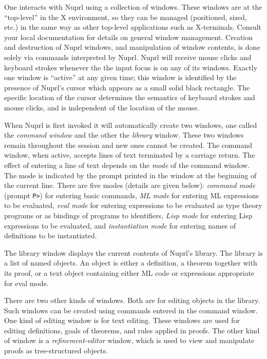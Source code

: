 One interacts with Nuprl using a collection of windows.  These windows are
at the ``top-level'' in the X environment, so they can be managed
(positioned, sized, etc.) in the same way as other top-level applications
such as X-terminals.  Consult your local documentation for details on
general window management.  Creation and destruction of Nuprl windows, and
manipulation of window contents, is done solely via commands interpreted by
Nuprl.  Nuprl will receive mouse clicks and keyboard strokes whenever the
the input focus is on any of its windows.  Exactly one window is
``active'' at any given time; this window is identified by the presence of
Nuprl's cursor which appears as a small solid black rectangle.  The
specific location of the cursor determines the semantics of keyboard
strokes and mouse clicks, and is independent of the location of the mouse.

When Nuprl is first invoked it will automatically create two windows, one
called the {\em command window} and the other the {\em library} window.  These
two windows remain throughout the session and new ones cannot be created.
The command window, when active, accepts lines of text terminated by a
carriage return.  The effect of entering a line of text depends on the
{\em mode} of the command window.  The mode is indicated by the prompt
printed in the window at the beginning of the current line.  There are five
modes (details are given below): {\em command mode} (prompt {\tt P>}) for
entering basic commands, {\em ML mode} for entering ML expressions to be
evaluated, {\em eval mode} for entering expressions to be evaluated as type
theory programs or as bindings of programs to identifiers, {\em Lisp mode} for
entering Lisp expressions to be evaluated, and {\em instantiation mode} for
entering names of definitions to be instantiated.

The library window displays the current contents of Nuprl's library.  The
library is a list of named objects.  An object is either a definition, a
theorem together with its proof, or a text object containing either ML code
or expressions appropriate for eval mode.

There are two other kinds of windows.  Both are for editing objects in the
library.  Such windows can be created using commands entered in the command
window.  One kind of editing window is for text editing.  These windows are
used for editing definitions, goals of theorems, and rules
applied in proofs.  The other kind of window is a {\em refinement-editor}
window, which is used to view and manipulate proofs as tree-structured
objects.

